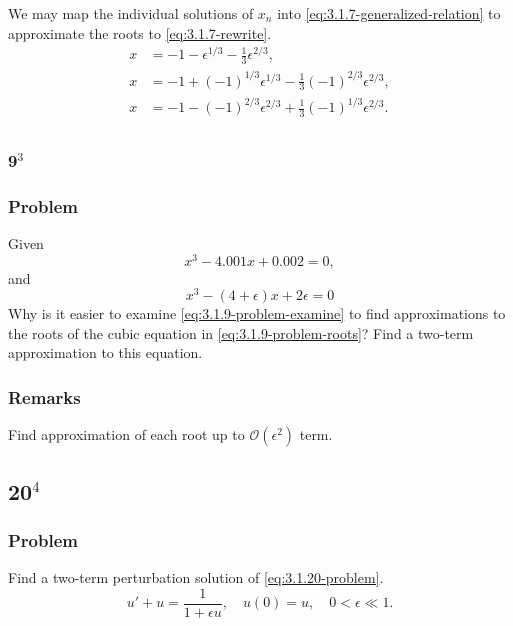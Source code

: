 \documentclass[12pt]{article}
\begin{document}
We may map the individual solutions of $x_n$ into
\cref{eq:3.1.7-generalized-relation} to approximate the roots to
\cref{eq:3.1.7-rewrite}.
\begin{equation*}
  \boxed{
    \begin{aligned}
      x &= -1 - \epsilon^{1/3} - \frac{1}{3}\epsilon^{2/3}, \\
      x &= -1 + {(-1)}^{1/3}\epsilon^{1/3} - \frac{1}{3}{(-1)}^{2/3}\epsilon^{2/3}, \\
      x &= -1 - {(-1)}^{2/3}\epsilon^{2/3} + \frac{1}{3}{(-1)}^{1/3}\epsilon^{2/3}. \\
    \end{aligned}
  }
\end{equation*}

\subsubsection{9$^3$}
\subsubsection*{Problem}
Given
\begin{equation}
  \label{eq:3.1.9-problem-roots}
  x^3-4.001x+0.002=0,
\end{equation}
and
\begin{equation}
  \label{eq:3.1.9-problem-examine}
  x^3-(4+\epsilon)x+2\epsilon=0
\end{equation}
Why is it easier to examine \cref{eq:3.1.9-problem-examine} to find
approximations to the roots of the cubic equation in
\cref{eq:3.1.9-problem-roots}? Find a two-term approximation to this equation.
\subsubsection*{Remarks}
Find approximation of each root up to $\mathcal{O}(\epsilon^2)$ term.

\subsection{20$^4$}
\subsubsection*{Problem}
Find a two-term perturbation solution of \cref{eq:3.1.20-problem}.
\begin{equation}
  \label{eq:3.1.20-problem}
  u'+u=\frac{1}{1+\epsilon u},\quad u(0)=u,\quad 0<\epsilon\ll1.
\end{equation}
\end{document}
